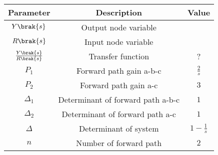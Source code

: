 \begin{tabular}{|c|c|c|}
\hline
\textbf{Parameter} & \textbf{Description} & \textbf{Value}\\ \hline
$Y\brak{s}$ & Output node variable &\\ \hline
$R\brak{s}$ & Input node variable &\\ \hline
$\frac{Y\brak{s}}{R\brak{s}}$ & Transfer function & ?\\ \hline
$P_1$ & Forward path gain a-b-c & $\frac{2}{s}$ \\ \hline
$P_2$ & Forward path gain a-c & $3$ \\ \hline
$\Delta_1$ & Determinant of forward path a-b-c & $1$ \\ \hline
$\Delta_2$ & Determinant of forward path a-c & $1$ \\ \hline
$\Delta$ & Determinant of system & $1-\frac{1}{s}$ \\ \hline
$n$ & Number of forward path & $2$ \\ \hline
\end{tabular}
